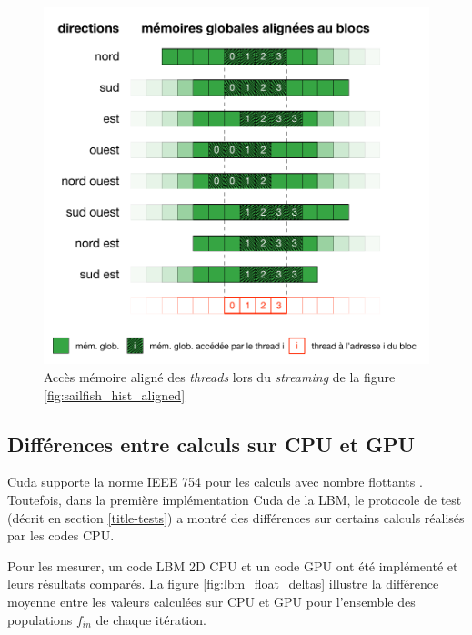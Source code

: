 \begin{figure}[h]
	\centering
	\includegraphics[fbox,scale=0.95]{images/streaming/sailfish_hist_dir_aligned.pdf}
	\caption{Accès mémoire aligné des \textit{threads} lors du \textit{streaming} de la figure \ref{fig:sailfish_hist_aligned}}
	\label{fig:sailfish_hist_dir_aligned}
\end{figure}

\subsection{Différences entre calculs sur CPU et GPU} \label{title-floats}
Cuda supporte la norme IEEE 754 pour les calculs avec nombre flottants \cite{noauthor_cuda_nodate}. Toutefois, dans la première implémentation Cuda de la \acs{LBM}, le protocole de test (décrit en section \ref{title-tests}) a montré des différences sur certains calculs réalisés par les codes \ac{CPU}.

Pour les mesurer, un code \ac{LBM} 2D \ac{CPU} et un code \ac{GPU} ont été implémenté et leurs résultats comparés. La figure \ref{fig:lbm_float_deltas} illustre la différence moyenne entre les valeurs calculées sur \ac{CPU} et \ac{GPU} pour l'ensemble des populations $f_{in}$ de chaque itération.

